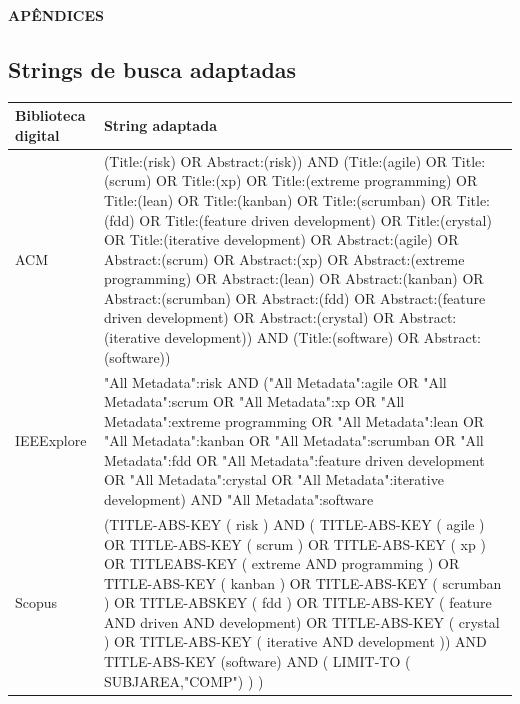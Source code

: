 \documentclass[
	12pt,
	openright,
	twoside,
	a4paper,
	english,
	brazil
	]{abntex2}
\begin{document}



\postextual



\cleardoublepage
{} 
{}
\thispagestyle{empty}
\vspace*{\fill}
\begin{center}
    \textbf{\Huge APÊNDICES}
\end{center}
\vspace*{\fill}

\begin{apendices}

\chapter{Strings de busca adaptadas}\label{apendiceA}

\vspace{-2em} %

\begin{table}[h!]
  \centering
  \begin{tabular}{|l|p{12cm}|}
    \hline
    \textbf{Biblioteca digital} & \textbf{String adaptada} \\
    \hline
    ACM & (Title:(risk) OR Abstract:(risk)) AND (Title:(agile) OR Title:(scrum) OR Title:(xp) OR Title:(extreme programming) OR Title:(lean) OR Title:(kanban) OR Title:(scrumban) OR Title:(fdd) OR Title:(feature driven development) OR Title:(crystal) OR Title:(iterative development) OR Abstract:(agile) OR Abstract:(scrum) OR Abstract:(xp) OR Abstract:(extreme programming) OR Abstract:(lean) OR Abstract:(kanban) OR Abstract:(scrumban) OR Abstract:(fdd) OR Abstract:(feature driven development) OR Abstract:(crystal) OR Abstract:(iterative development)) AND (Title:(software) OR Abstract:(software)) \\
    \hline
    IEEExplore & "All Metadata":risk AND ("All Metadata":agile OR "All Metadata":scrum OR "All Metadata":xp OR "All Metadata":extreme programming OR "All Metadata":lean OR "All Metadata":kanban OR "All Metadata":scrumban OR "All Metadata":fdd OR "All Metadata":feature driven development OR "All Metadata":crystal OR "All Metadata":iterative development) AND "All Metadata":software \\
    \hline
    Scopus & (TITLE-ABS-KEY ( risk ) AND ( TITLE-ABS-KEY ( agile ) OR TITLE-ABS-KEY ( scrum ) OR TITLE-ABS-KEY ( xp ) OR TITLEABS-KEY ( extreme AND programming ) OR TITLE-ABS-KEY ( kanban ) OR TITLE-ABS-KEY ( scrumban ) OR TITLE-ABSKEY ( fdd ) OR TITLE-ABS-KEY ( feature AND driven AND development) OR TITLE-ABS-KEY ( crystal ) OR TITLE-ABS-KEY ( iterative AND development )) AND TITLE-ABS-KEY (software) AND ( LIMIT-TO ( SUBJAREA,"COMP") ) ) \\
    \hline
  \end{tabular}
\end{table}


\end{apendices}
\end{document}
